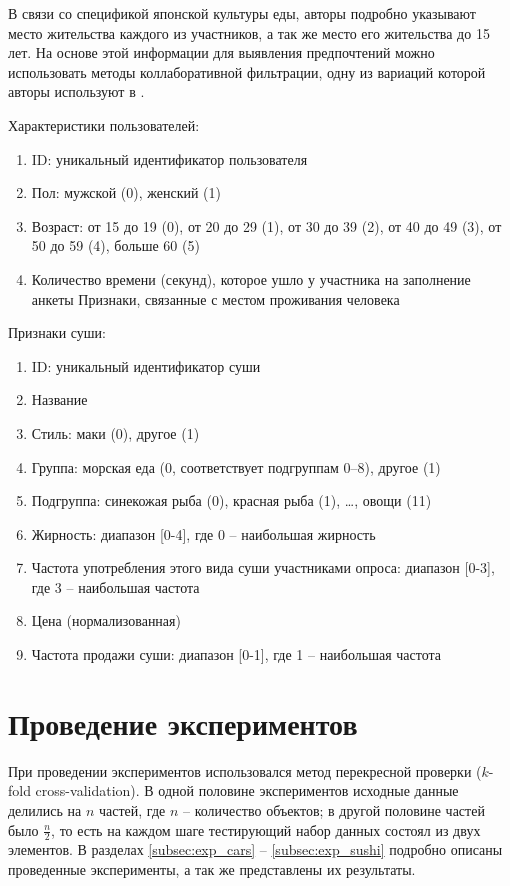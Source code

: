 		В связи со спецификой японской культуры еды, авторы подробно указывают место жительства каждого из участников, а так же место его жительства до 15 лет. На основе этой информации для выявления предпочтений можно использовать методы коллаборативной фильтрации\cite{Ricci:2011}, одну из вариаций которой авторы используют в \cite{Kamishima:2003}.
		
		\vspace{1em}
		
		\noindent Характеристики пользователей:
		\vspace{-0.7em}
		\begin{enumerate}[itemsep=-1.5mm]
			\item ID: уникальный идентификатор пользователя
			\item Пол: мужской (0), женский (1)
			\item Возраст: от 15 до 19 (0), от 20 до 29 (1), от 30 до 39 (2), от 40 до 49 (3), от 50 до 59 (4), больше 60 (5)
			\item Количество времени (секунд), которое ушло у участника на заполнение анкеты
			 Признаки, связанные с местом проживания человека
		\end{enumerate}
		
		\noindent Признаки суши:
		\vspace{-0.7em}
		\begin{enumerate}[itemsep=-1.5mm]
			\item ID: уникальный идентификатор суши
			\item Название
			\item Стиль: маки (0), другое (1)
			\item Группа: морская еда (0, соответствует подгруппам 0--8), другое (1)
			\item Подгруппа: синекожая рыба (0), красная рыба (1), \dots, овощи (11) 
			\item Жирность: диапазон [0-4], где 0 -- наибольшая жирность
			\item Частота употребления этого вида суши участниками опроса: диапазон [0-3], где 3 -- наибольшая частота
			\item Цена (нормализованная)
			\item Частота продажи суши: диапазон [0-1], где 1 -- наибольшая частота
		\end{enumerate}
	

\section{Проведение экспериментов}
	При проведении экспериментов использовался метод перекресной проверки ($k$-fold cross-validation)\cite{Hastie:2001}. В одной половине экспериментов исходные данные делились на $n$ частей, где $n$ – количество объектов; в другой половине частей было $\frac{n}{2}$, то есть на каждом шаге тестирующий набор данных состоял из двух элементов. В разделах \ref{subsec:exp_cars} -- \ref{subsec:exp_sushi} подробно описаны проведенные эксперименты, а так же представлены их результаты.
	
